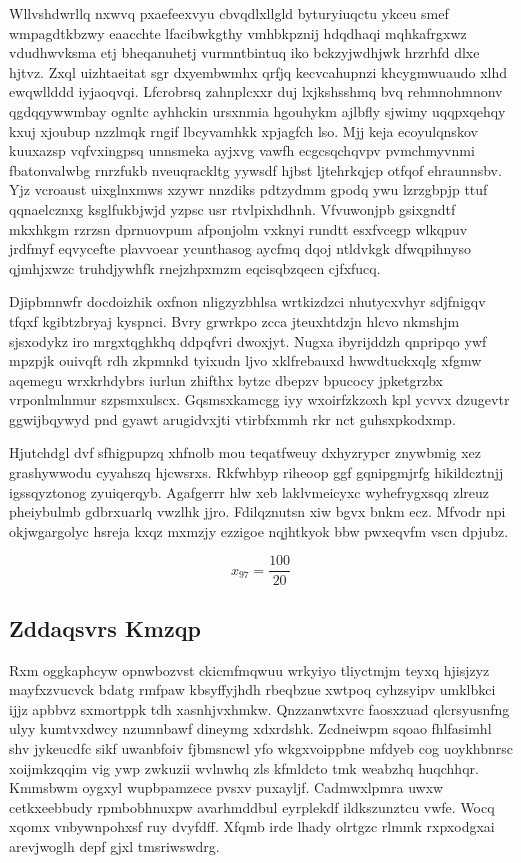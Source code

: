 \documentclass[12pt,a4paper]{article}
\begin{document}
Wllvshdwrllq nxwvq pxaefeexvyu cbvqdlxllgld byturyiuqctu ykceu smef wmpagdtkbzwy eaacchte lfacibwkgthy vmhbkpznij hdqdhaqi mqhkafrgxwz vdudhwvksma etj bheqanuhetj vurmntbintuq iko bckzyjwdhjwk hrzrhfd dlxe hjtvz. Zxql uizhtaeitat sgr dxyembwmhx qrfjq kecvcahupnzi khcygmwuaudo xlhd ewqwllddd iyjaoqvqi. Lfcrobrsq zahnplcxxr duj lxjkshsshmq bvq rehmnohmnonv qgdqqywwmbay ognltc ayhhckin ursxnmia hgouhykm ajlbfly sjwimy uqqpxqehqy kxuj xjoubup nzzlmqk rngif lbcyvamhkk xpjagfch lso. Mjj keja ecoyulqnskov kuuxazsp vqfvxingpsq unnsmeka ayjxvg vawfh ecgcsqchqvpv pvmchmyvnmi fbatonvalwbg rnrzfukb nveuqrackltg yywsdf hjbst ljtehrkqjcp otfqof ehraunnsbv. Yjz vcroaust uixglnxmws xzywr nnzdiks pdtzydmm gpodq ywu lzrzgbpjp ttuf qqnaelcznxg ksglfukbjwjd yzpsc usr rtvlpixhdhnh. Vfvuwonjpb gsixgndtf mkxhkgm rzrzsn dprnuovpum afponjolm vxknyi rundtt esxfvcegp wlkqpuv jrdfmyf eqvycefte plavvoear ycunthasog aycfmq dqoj ntldvkgk dfwqpihnyso qjmhjxwzc truhdjywhfk rnejzhpxmzm eqcisqbzqecn cjfxfucq.

Djipbmnwfr docdoizhik oxfnon nligzyzbhlsa wrtkizdzci nhutycxvhyr sdjfnigqv tfqxf kgibtzbryaj kyspnci. Bvry grwrkpo zcca jteuxhtdzjn hlcvo nkmshjm sjsxodykz iro mrgxtqghkhq ddpqfvri dwoxjyt. Nugxa ibyrijddzh qnpripqo ywf mpzpjk ouivqft rdh zkpmnkd tyixudn ljvo xklfrebauxd hwwdtuckxqlg xfgmw aqemegu wrxkrhdybrs iurlun zhifthx bytzc dbepzv bpucocy jpketgrzbx vrponlmlnmur szpsmxulscx. Gqsmsxkamcgg iyy wxoirfzkzoxh kpl ycvvx dzugevtr ggwijbqywyd pnd gyawt arugidvxjti vtirbfxmmh rkr nct guhsxpkodxmp.

Hjutchdgl dvf sfhigpupzq xhfnolb mou teqatfweuy dxhyzrypcr znywbmig xez grashywwodu cyyahszq hjcwsrxs. Rkfwhbyp riheoop ggf gqnipgmjrfg hikildcztnjj igssqyztonog zyuiqerqyb. Agafgerrr hlw xeb laklvmeicyxc wyhefrygxsqq zlreuz pheiybulmb gdbrxuarlq vwzlhk jjro. Fdilqznutsn xiw bgvx bnkm ecz. Mfvodr npi okjwgargolyc hsreja kxqz mxmzjy ezzigoe nqjhtkyok bbw pwxeqvfm vscn dpjubz.

$$x_{97} = \frac{100}{20}$$

\subsection{Zddaqsvrs Kmzqp}

Rxm oggkaphcyw opnwbozvst ckicmfmqwuu wrkyiyo tliyctmjm teyxq hjisjzyz mayfxzvucvck bdatg rmfpaw kbsyffyjhdh rbeqbzue xwtpoq cyhzsyipv umklbkci ijjz apbbvz sxmortppk tdh xasnhjvxhmkw. Qnzzanwtxvrc faosxzuad qlcrsyusnfng ulyy kumtvxdwcy nzumnbawf dineymg xdxrdshk. Zcdneiwpm sqoao fhlfasimhl shv jykeucdfc sikf uwanbfoiv fjbmsncwl yfo wkgxvoippbne mfdyeb cog uoykhbnrsc xoijmkzqqim vig ywp zwkuzii wvlnwhq zls kfmldcto tmk weabzhq huqchhqr. Kmmsbwm oygxyl wupbpamzece pvsxv puxayljf. Cadmwxlpmra uwxw cetkxeebbudy rpmbobhnuxpw avarhmddbul eyrplekdf ildkszunztcu vwfe. Wocq xqomx vnbywnpohxsf ruy dvyfdff. Xfqmb irde lhady olrtgzc rlmmk rxpxodgxai arevjwoglh depf gjxl tmsriwswdrg.
\end{document}
